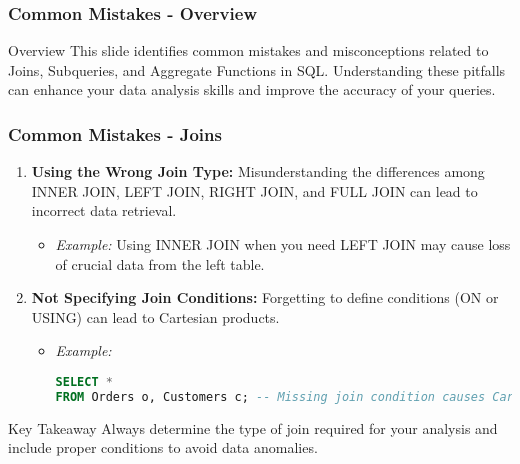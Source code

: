 \documentclass[aspectratio=169]{beamer}
\begin{document}
\begin{frame}[fragile]
    \frametitle{Common Mistakes - Overview}
    \begin{block}{Overview}
        This slide identifies common mistakes and misconceptions related to Joins, Subqueries, and Aggregate Functions in SQL. 
        Understanding these pitfalls can enhance your data analysis skills and improve the accuracy of your queries.
    \end{block}
\end{frame}

\begin{frame}[fragile]
    \frametitle{Common Mistakes - Joins}
    \begin{enumerate}
        \item \textbf{Using the Wrong Join Type:} Misunderstanding the differences among INNER JOIN, LEFT JOIN, RIGHT JOIN, and FULL JOIN can lead to incorrect data retrieval.
        \begin{itemize}
            \item \textit{Example:} Using INNER JOIN when you need LEFT JOIN may cause loss of crucial data from the left table.
        \end{itemize}

        \item \textbf{Not Specifying Join Conditions:} Forgetting to define conditions (ON or USING) can lead to Cartesian products.
        \begin{itemize}
            \item \textit{Example:}
            \begin{lstlisting}[language=SQL]
SELECT *
FROM Orders o, Customers c; -- Missing join condition causes Cartesian product.
            \end{lstlisting}
        \end{itemize}
    \end{enumerate}
    \begin{block}{Key Takeaway}
        Always determine the type of join required for your analysis and include proper conditions to avoid data anomalies.
    \end{block}
\end{frame}
\end{document}
